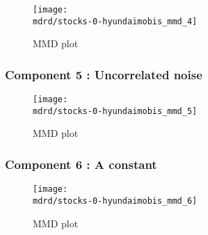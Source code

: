 \documentclass{article} %
\begin{document}
\begin{figure}[H]
\newcommand{\wmgd}{0.5\columnwidth}
\newcommand{\hmgd}{3.0cm}
\newcommand{\mdrd}{stocks-0-hyundaimobis}
\newcommand{\mbm}{\hspace{-0.3cm}}
\texttt{[image: \\mdrd/stocks-0-hyundaimobis\_mmd\_4]}
\caption{
MMD plot}
\label{fig:mmd4}
\end{figure}

\subsubsection{Component 5 : Uncorrelated noise}

\begin{figure}[H]
\newcommand{\wmgd}{0.5\columnwidth}
\newcommand{\hmgd}{3.0cm}
\newcommand{\mdrd}{stocks-0-hyundaimobis}
\newcommand{\mbm}{\hspace{-0.3cm}}
\texttt{[image: \\mdrd/stocks-0-hyundaimobis\_mmd\_5]}
\caption{
MMD plot}
\label{fig:mmd5}
\end{figure}

\subsubsection{Component 6 : A constant}

\begin{figure}[H]
\newcommand{\wmgd}{0.5\columnwidth}
\newcommand{\hmgd}{3.0cm}
\newcommand{\mdrd}{stocks-0-hyundaimobis}
\newcommand{\mbm}{\hspace{-0.3cm}}
\texttt{[image: \\mdrd/stocks-0-hyundaimobis\_mmd\_6]}
\caption{
MMD plot}
\label{fig:mmd6}
\end{figure}
\end{document}
